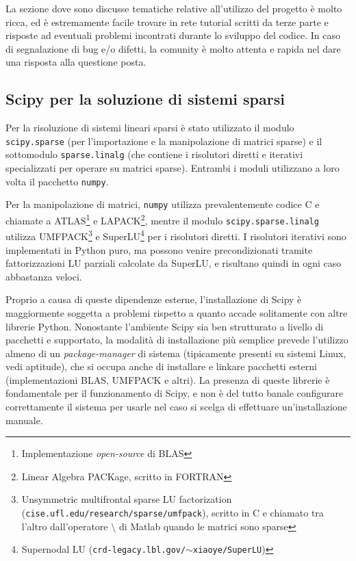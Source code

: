 \documentclass[11pt,a4paper]{scrartcl}
\begin{document}
La sezione dove sono discusse tematiche relative all'utilizzo del progetto è molto ricca, ed è estremamente facile trovare in rete tutorial scritti da terze parte e risposte ad eventuali problemi incontrati durante lo sviluppo del codice. In caso di segnalazione di bug e/o difetti, la comunity è molto attenta e rapida nel dare una risposta alla questione posta. 

%
%

\subsection*{Scipy per la soluzione di sistemi sparsi}

Per la risoluzione di sistemi lineari sparsi è stato utilizzato il modulo \texttt{scipy.sparse} (per l'importazione e la manipolazione di matrici sparse) e il sottomodulo \texttt{sparse.linalg} (che contiene i risolutori diretti e iterativi specializzati per operare su matrici sparse). Entrambi i moduli utilizzano a loro volta il pacchetto \texttt{numpy}.

Per la manipolazione di matrici, \texttt{numpy} utilizza prevalentemente codice C e chiamate a ATLAS\footnote{Implementazione \emph{open-source} di BLAS} e LAPACK\footnote{Linear Algebra PACKage, scritto in FORTRAN}, mentre il modulo \texttt{scipy.sparse.linalg} utilizza UMFPACK\footnote{Unsymmetric multifrontal sparse LU factorization (\texttt{cise.ufl.edu/research/sparse/umfpack}), scritto in C e chiamato tra l'altro dall'operatore $\setminus$ di Matlab quando le matrici sono sparse} e SuperLU\footnote{Supernodal LU (\texttt{crd-legacy.lbl.gov/$\sim$xiaoye/SuperLU})} per i risolutori diretti. I risolutori iterativi sono implementati in Python puro, ma possono venire precondizionati tramite fattorizzazioni LU parziali calcolate da SuperLU, e risultano quindi in ogni caso abbastanza veloci.

Proprio a causa di queste dipendenze esterne, l'installazione di Scipy è maggiormente soggetta a problemi rispetto a quanto accade solitamente con altre librerie Python. Nonostante l'ambiente Scipy sia ben strutturato a livello di pacchetti e supportato, la modalità di installazione più semplice prevede l'utilizzo almeno di un \emph{package-manager} di sistema (tipicamente presenti su sistemi Linux, vedi aptitude), che si occupa anche di installare e linkare pacchetti esterni (implementazioni BLAS, UMFPACK e altri). La presenza di queste librerie è fondamentale per il funzionamento di Scipy, e non è del tutto banale configurare correttamente il sistema per usarle nel caso si scelga di effettuare un'installazione manuale.
\end{document}
